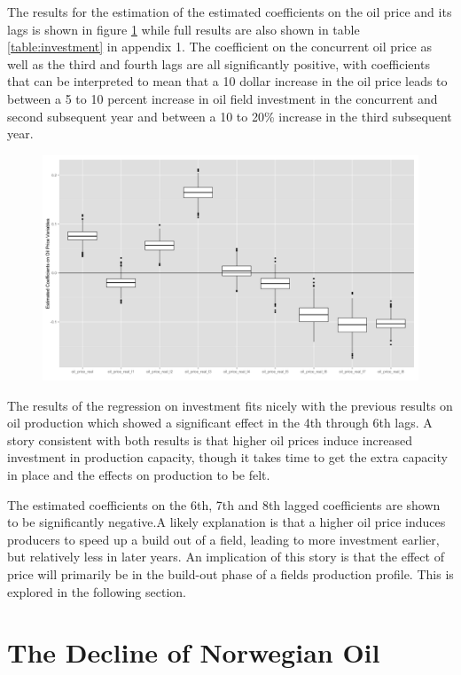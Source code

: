 \documentclass[12pt]{article}
\begin{document}
The results for the estimation of the estimated coefficients on the oil price and its lags is shown in figure \ref{gam_price_invest_box} while full results are also shown in table \ref{table:investment} in appendix 1.  The coefficient on the concurrent oil price as well as the third and fourth lags are all significantly positive, with coefficients that can be interpreted to mean that a 10 dollar increase in the oil price leads to between a 5 to 10 percent increase in oil field investment in the concurrent and second subsequent year and between a 10 to 20\% increase in the third subsequent year.  

\begin{figure}
	\includegraphics[width=1\textwidth]{figures/invest_pooled_print.png}
	\caption{}
	\label{gam_price_invest_box}
\end{figure}

The results of the regression on investment fits nicely with the previous results on oil production which showed a significant effect in the 4th through 6th lags.  A story consistent with both results is that higher oil prices induce increased investment in production capacity, though it takes time to get the extra capacity in place and the effects on production to be felt.

The estimated coefficients on the 6th, 7th and 8th lagged coefficients are shown to be significantly negative.A likely explanation is that a higher oil price induces producers to speed up a build out of a field, leading to more investment earlier, but relatively less in later years.  An implication of this story is that the effect of price will primarily be in the build-out phase of a fields production profile.  This is explored in the following section.

\section{The Decline of Norwegian Oil}
\end{document}
